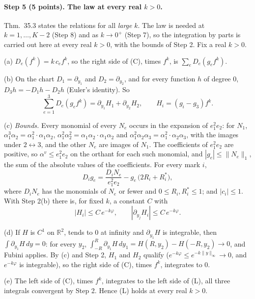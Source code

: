 \documentclass[11pt]{article}
\theoremstyle{plain}
\theoremstyle{definition}
\theoremstyle{remark}
\begin{document}
\paragraph{Step 5 (5 points). The law at every real $k>0$.}
Thm.~35.3 states the relations for all \emph{large} $k$. The law is needed at $k=1,\dots,K-2$ (Step 8) and as $k\to0^+$ (Step 7), so the integration by parts is carried out here at every real $k>0$, with the bounds of Step 2. Fix a real $k>0$.

(a) $D_e(f^k)=k\,c_ef^k$, so the right side of (C), times $f^k$, is $\sum_eD_e(g_ef^k)$.

(b) On the chart $D_1=\partial_{y_1}$ and $D_2=\partial_{y_2}$, and for every function $h$ of degree $0$, $D_3h=-D_1h-D_2h$ (Euler's identity). So
\[
\sum_{e=1}^3D_e(g_ef^k)=\partial_{y_1}H_1+\partial_{y_2}H_2,\qquad H_i=(g_i-g_3)f^k .
\]

(c) \emph{Bounds.} Every monomial of every $N_e$ occurs in the expansion of $e_1^2e_2$: for $N_1$, $\alpha_1^3\alpha_2=\alpha_1^2\cdot\alpha_1\alpha_2$, $\alpha_1^2\alpha_2^2=\alpha_1\alpha_2\cdot\alpha_1\alpha_2$ and $\alpha_1^2\alpha_2\alpha_3=\alpha_1^2\cdot\alpha_2\alpha_3$, with the images under $2\leftrightarrow3$, and the other $N_e$ are images of $N_1$. The coefficients of $e_1^2e_2$ are positive, so $\alpha^v\le e_1^2e_2$ on the orthant for each such monomial, and $|g_e|\le\|N_e\|_1$, the sum of the absolute values of the coefficients. For every mark $i$,
\[
D_ig_e=\frac{D_iN_e}{e_1^2e_2}-g_e\,\big(2R_i+R^\ast_i\big),
\]
where $D_iN_e$ has the monomials of $N_e$ or fewer and $0\le R_i,R^\ast_i\le1$; and $|c_i|\le1$. With Step 2(b) there is, for fixed $k$, a constant $C$ with
\[
|H_i|\le C\,e^{-k\varphi},\qquad |\partial_{y_j}H_i|\le C\,e^{-k\varphi} .
\]

(d) If $H$ is $C^1$ on $\mathbb R^2$, tends to $0$ at infinity and $\partial_{y_1}H$ is integrable, then $\int\partial_{y_1}H\,dy=0$: for every $y_2$, $\int_{-R}^R\partial_{y_1}H\,dy_1=H(R,y_2)-H(-R,y_2)\to0$, and Fubini applies. By (c) and Step 2, $H_1$ and $H_2$ qualify ($e^{-k\varphi}\le e^{-k\|y\|_\infty}\to0$, and $e^{-k\varphi}$ is integrable), so the right side of (C), times $f^k$, integrates to $0$.

(e) The left side of (C), times $f^k$, integrates to the left side of (L), all three integrals convergent by Step 2. Hence (L) holds at every real $k>0$.
\end{document}
